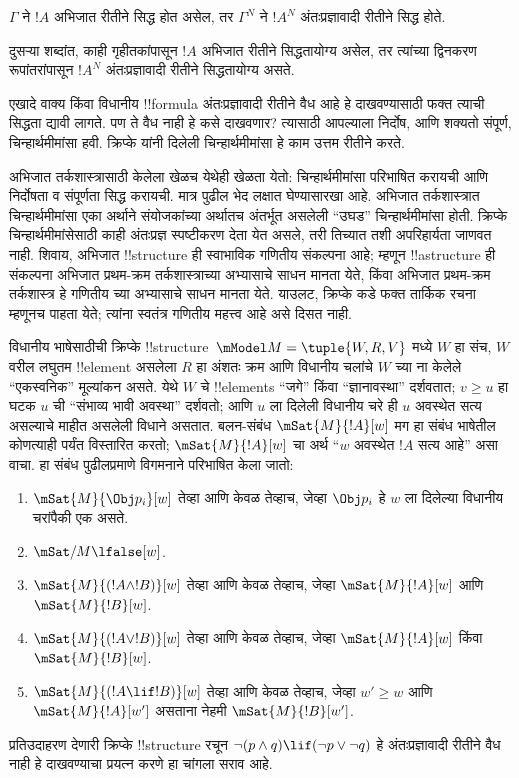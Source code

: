 \documentclass[../../../include/open-logic-section]{subfiles}
\begin{document}
\begin{thm}
$\Gamma$ ने $!A$ अभिजात रीतीने सिद्ध होत असेल, तर $\Gamma^N$ ने $!A^N$
अंतःप्रज्ञावादी रीतीने सिद्ध होते.
\end{thm}

दुसऱ्या शब्दांत, काही गृहीतकांपासून $!A$ अभिजात रीतीने सिद्धतायोग्य असेल,
तर त्यांच्या द्विनकरण रूपांतरांपासून $!A^N$ अंतःप्रज्ञावादी रीतीने
सिद्धतायोग्य असते.

एखादे वाक्य किंवा विधानीय !!{formula} अंतःप्रज्ञावादी रीतीने वैध आहे हे
दाखवण्यासाठी फक्त त्याची सिद्धता द्यावी लागते. पण ते वैध नाही हे कसे
दाखवणार? त्यासाठी आपल्याला निर्दोष, आणि शक्यतो संपूर्ण, चिन्हार्थमीमांसा हवी.
क्रिप्के यांनी दिलेली चिन्हार्थमीमांसा हे काम उत्तम रीतीने करते.

अभिजात तर्कशास्त्रासाठी केलेला खेळच येथेही खेळता येतो: चिन्हार्थमीमांसा
परिभाषित करायची आणि निर्दोषता व संपूर्णता सिद्ध करायची. मात्र पुढील भेद लक्षात
घेण्यासारखा आहे. अभिजात तर्कशास्त्रात चिन्हार्थमीमांसा एका अर्थाने
संयोजकांच्या अर्थातच अंतर्भूत असलेली “उघड” चिन्हार्थमीमांसा होती. क्रिप्के
चिन्हार्थमीमांसेसाठी काही अंतःप्रज्ञ स्पष्टीकरण देता येत असले, तरी तिच्यात
तशी अपरिहार्यता जाणवत नाही. शिवाय, अभिजात !!{structure} ही स्वाभाविक गणितीय
संकल्पना आहे; म्हणून !!a{structure} ही संकल्पना अभिजात प्रथम-क्रम
तर्कशास्त्राच्या अभ्यासाचे साधन मानता येते, किंवा अभिजात प्रथम-क्रम
तर्कशास्त्र हे गणितीय च्या अभ्यासाचे साधन मानता येते.
याउलट, क्रिप्के कडे फक्त तार्किक रचना म्हणूनच पाहता येते;
त्यांना स्वतंत्र गणितीय महत्त्व आहे असे दिसत नाही.

विधानीय भाषेसाठीची क्रिप्के !!{structure}~$\mModel M = \tuple{W, R, V}$
मध्ये $W$ हा संच, $W$ वरील लघुतम !!{element} असलेला $R$ हा अंशतः क्रम आणि
विधानीय चलांचे $W$ च्या ना केलेले “एकस्वनिक” मूल्यांकन असते.
येथे $W$ चे !!{element}s “जगे” किंवा “ज्ञानावस्था” दर्शवतात; $v \geq u$ हा
घटक $u$ ची “संभाव्य भावी अवस्था” दर्शवतो; आणि $u$ ला दिलेली विधानीय चरे ही
$u$ अवस्थेत सत्य असल्याचे माहीत असलेली विधाने असतात. बलन-संबंध
$\mSat{M}{!A}[w]$ मग हा संबंध भाषेतील कोणत्याही पर्यंत
विस्तारित करतो; $\mSat{M}{!A}[w]$ चा अर्थ “$w$ अवस्थेत $!A$ सत्य आहे” असा
वाचा. हा संबंध पुढीलप्रमाणे विगमनाने परिभाषित केला जातो:
\begin{enumerate}
\item $\mSat{M}{\Obj p_i}[w]$ तेव्हा आणि केवळ तेव्हाच, जेव्हा $\Obj p_i$
  हे $w$ ला दिलेल्या विधानीय चरांपैकी एक असते.
\item $\mSat/{M}{\lfalse}[w]$.
\item $\mSat{M}{(!A \land !B)}[w]$ तेव्हा आणि केवळ तेव्हाच, जेव्हा
  $\mSat{M}{!A}[w]$ आणि $\mSat{M}{!B}[w]$.
\item $\mSat{M}{(!A \lor !B)}[w]$ तेव्हा आणि केवळ तेव्हाच, जेव्हा
  $\mSat{M}{!A}[w]$ किंवा $\mSat{M}{!B}[w]$.
\item $\mSat{M}{(!A \lif !B)}[w]$ तेव्हा आणि केवळ तेव्हाच, जेव्हा
  $w' \geq w$ आणि $\mSat{M}{!A}[w']$ असताना नेहमी $\mSat{M}{!B}[w']$.
\end{enumerate}
प्रतिउदाहरण देणारी क्रिप्के !!{structure} रचून $\lnot (p \land q) \lif
(\lnot p \lor \lnot q)$ हे अंतःप्रज्ञावादी रीतीने वैध नाही हे दाखवण्याचा
प्रयत्न करणे हा चांगला सराव आहे.
\end{document}
